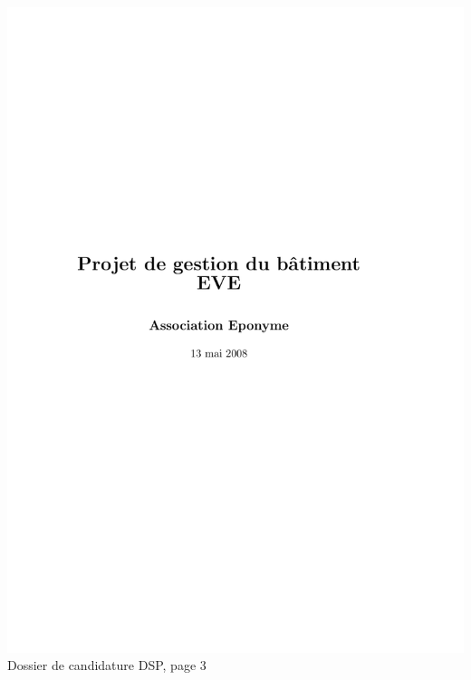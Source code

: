 \includegraphics[scale=0.85,trim=20mm 20mm 20mm 20mm,clip,page=3]{annexes/candidature_dsp.pdf} \\
Dossier de candidature DSP, page 3
\newpage
